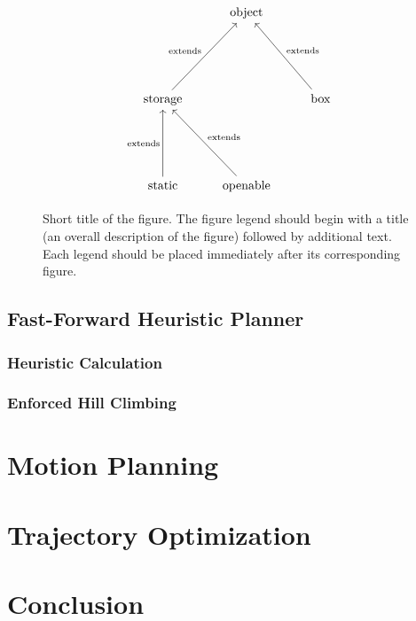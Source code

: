 \documentclass{article}
\begin{document}
\begin{figure}[h]
    \[\begin{tikzcd}
        & {\text{object}} \\
        \\
        \\
        {\text{storage}} && {\text{box}} \\
        \\
        \\
        {\text{static}} & {\text{openable}}
        \arrow["{\text{extends}}", from=4-1, to=1-2]
        \arrow["{\text{extends}}"', from=4-3, to=1-2]
        \arrow["{\text{extends}}"', from=7-2, to=4-1]
        \arrow["{\text{extends}}", from=7-1, to=4-1]
    \end{tikzcd}\]

    \caption{Short title of the figure. The figure legend should begin with a title (an overall description of the figure) followed by additional text. Each legend should be placed immediately after its corresponding figure.}
    \label{fig:types}
\end{figure}

\subsection{Fast-Forward Heuristic Planner}

\subsubsection{Heuristic Calculation}

\subsubsection{Enforced Hill Climbing}

\section{Motion Planning}

\section{Trajectory Optimization}

\cite{Cui1}

\section{Conclusion}

\printbibliography
\end{document}
